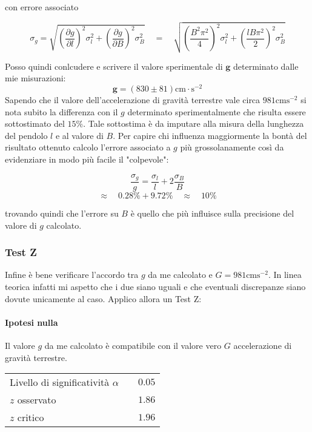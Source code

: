\documentclass{article}
\begin{document}
	con errore associato
	
	\[
	\sigma_g = \sqrt{\left(\frac{\partial g}{\partial l} \right)^2\sigma_l^2 + \left(\frac{\partial g}{\partial B} \right)^2 \sigma_B^2}  \quad = \quad 	\sqrt{\left(\frac{B^2\pi^2}{4}\right)^2 \sigma_l^2 + \left( \frac{lB\pi^2}{2}  \right)^2 \sigma_B^2}	 
	\]
	
	
	\noindent
	Posso quindi conlcudere e scrivere il valore sperimentale di $\mathbf{g}$ determinato dalle mie misurazioni:
	\[
	\mathbf{g} = (830 \pm 81)\text{cm}\cdot \text{s}^{-2}
	\]
	\noindent
	Sapendo che il valore dell'accelerazione di gravità terrestre vale circa $981\text{cms}^{-2}$ si nota subito la differenza con il $g$ determinato sperimentalmente che risulta essere sottostimato del $15\%$. Tale sottostima è da imputare alla misura della lunghezza del pendolo $l$ e al valore di $B$.  Per capire chi influenza maggiormente la bontà del risultato ottenuto calcolo l'errore associato a $g$ più grossolanamente così da evidenziare in modo più facile il "colpevole":
	
	\[
	\frac{\sigma_g}{g} = \frac{\sigma_l}{l} + 2\frac{\sigma_B}{B} 
	\]
	\[
	\approx \quad 0.28 \% + 9.72 \% \quad \approx  \quad 10\%	
	\]
	
	trovando quindi che l'errore su $B$ è quello che più influisce sulla precisione del valore di $g$ calcolato.
	\\
	
	\subsubsection{Test Z}
	Infine è bene verificare l'accordo tra $g$ da me calcolato e $G = 981 \text{cms}^{-2}$. In linea teorica infatti mi aspetto che i due siano uguali e che eventuali discrepanze siano dovute unicamente al caso. Applico allora un Test Z:
	
	\paragraph{Ipotesi nulla} Il valore $g$ da me calcolato è compatibile con il valore vero $G$ accelerazione di gravità terrestre.
	
	\vspace{0.7cm}
	\begin{table}[H]
		\centering
		\begin{tabular}{lr}
			Livello di significatività $\alpha$	& $\quad 0.05$  \\
			$z$ osservato             	& $\quad 1.86$  \\
			$z$ critico 		& $\quad 1.96$  \\ 
		\end{tabular}
	\end{table}
	\vspace{0.7cm}
	
\end{document}
